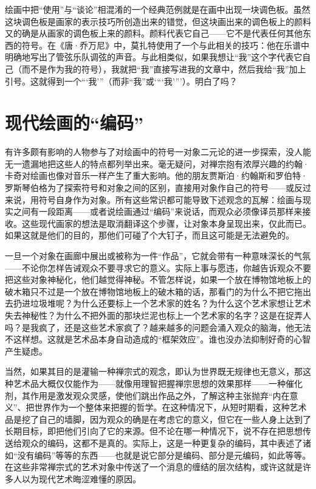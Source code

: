 绘画中把“使用”与“谈论”相混淆的一个经典范例就是在画中出现一块调色板。虽然这块调色板是画家的表示技巧所创造出来的错觉，但这块画出来的调色板上的颜料又的确是从画家的调色板上来的颜料。颜料代表它自己——它不是代表任何其他东西的符号。在《唐·乔万尼》中，莫扎特使用了一个与此相关的技巧：他在乐谱中明确地写出了管弦乐队调弦的声音。与此相类似，如果我想让“我”这个字代表它自己（而不是作为我的符号），我就把“我”直接写进我的文章中，然后我给“我”加上引号。这就得到一个“‘我’”（而非“我”或‘“‘我’”’）。明白了吗？

\section{现代绘画的“编码”}

有许多颇有影响的人物参与了对绘画中的符号一对象二元论的进一步探索，没人能无一遗漏地把这些人的特点都列举出来。毫无疑问，对禅宗抱有浓厚兴趣的约翰·卡奇对绘画也像对音乐一样产生了重大影响。他的朋友贾斯泊·约翰斯和罗伯特·罗斯琴伯格为了探索符号和对象之间的区别，直接用对象作自己的符号——或反过来说，用符号自身作为对象。所有这些常识都可能导致下述观念的瓦解：绘画与现实之间有一段距离——或者说绘画通过“编码”来说话，而观众必须像译员那样来接收。这些现代画家的想法是取消翻译这个步骤，让对象本身呈现出来，仅此而已。如果这就是他们的目的，那他们可碰了个大钉子，而且这可能是无法避免的。

一旦一个对象在画廊中展出或被称为一件“作品”，它就会带有一种意味深长的气氛——不论你怎样告诫观众不要寻求它的意义。实际上事与愿违，你越告诉观众不要把这些对象神秘化，他们越觉得神秘。不管怎样说，如果一个放在博物馆地板上的破木箱只不过是一个放在博物馆地板上的破木箱的话，那看门的为什么不把它拖出去扔进垃圾堆呢？为什么还要标上一个艺术家的姓名？为什么这个艺术家想让艺术失去神秘性？为什么不把外面的那块烂泥也标上一个艺术家的名字？这是在捉弄人吗？是我疯了，还是这些艺术家疯了？越来越多的问题会涌入观众的脑海，他无法不这样想。这就是艺术品本身自动造成的“框架效应”。谁也没办法抑制好奇的心智产生疑虑。

当然，如果其目的是灌输一种禅宗式的观念，即认为世界既无规律也无意义，那这种艺术品大概仅仅能作为——就像用理智把握禅宗思想的效果那样——一种催化剂，其作用是激发观众灵感，使他们跳出作品之外，了解这种主张抛弃“内在意义”、把世界作为一个整体来把握的哲学。在这种情况下，从短时期看，这种艺术品是挖了自己的墙脚，因为观众的确是在考虑它的意义，但它在一些人身上达到了长期目标，即把他们引向了它的来源。但不论在哪一种情况下，说不存在把思想传送给观众的编码，这都不是真的。实际上，这是一种更复杂的编码，其中表述了诸如“没有编码”等等的东西——也就是说它部分是编码、部分是元编码，如此等等。在这些非常禅宗式的艺术对象中传送了一个消息的缠结的层次结构，或许这就是许多人以为现代艺术晦涩难懂的原因。

